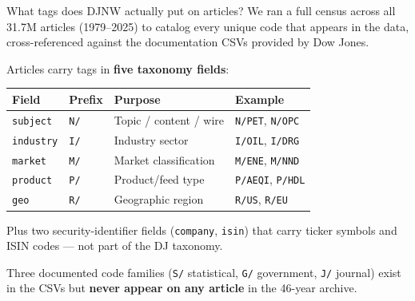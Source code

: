 \documentclass[10pt,aspectratio=169]{beamer}
\begin{document}
\begin{frame}{What tags does DJNW actually put on articles?}
  \small
  We ran a full census across all 31.7M articles (1979--2025) to catalog
  every unique code that appears in the data, cross-referenced against the
  documentation CSVs provided by Dow Jones.

  \medskip
  Articles carry tags in \textbf{five taxonomy fields}:
  \footnotesize
  \begin{tabular}{@{}llll@{}}
    \toprule
    \textbf{Field} & \textbf{Prefix} & \textbf{Purpose} & \textbf{Example} \\
    \midrule
    \texttt{subject} & \texttt{N/} & Topic / content / wire & \texttt{N/PET}, \texttt{N/OPC} \\
    \texttt{industry} & \texttt{I/} & Industry sector & \texttt{I/OIL}, \texttt{I/DRG} \\
    \texttt{market} & \texttt{M/} & Market classification & \texttt{M/ENE}, \texttt{M/NND} \\
    \texttt{product} & \texttt{P/} & Product/feed type & \texttt{P/AEQI}, \texttt{P/HDL} \\
    \texttt{geo} & \texttt{R/} & Geographic region & \texttt{R/US}, \texttt{R/EU} \\
    \bottomrule
  \end{tabular}

  \medskip
  \small
  Plus two security-identifier fields (\texttt{company}, \texttt{isin}) that
  carry ticker symbols and ISIN codes --- not part of the DJ taxonomy.

  \medskip
  Three documented code families (\texttt{S/} statistical, \texttt{G/}
  government, \texttt{J/} journal) exist in the CSVs but \textbf{never
  appear on any article} in the 46-year archive.
\end{frame}
\end{document}

